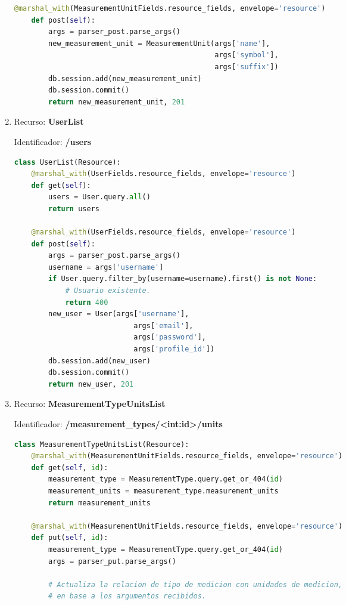 \begin{enumerate}
\begin{lstlisting}[language=Python]
    @marshal_with(MeasurementUnitFields.resource_fields, envelope='resource')
    def post(self):
        args = parser_post.parse_args()
        new_measurement_unit = MeasurementUnit(args['name'],
                                               args['symbol'],
                                               args['suffix'])
        db.session.add(new_measurement_unit)
        db.session.commit()
        return new_measurement_unit, 201
\end{lstlisting}

\item Recurso: \textbf{UserList}

Identificador: \textbf{/users}

\begin{lstlisting}[language=Python]
class UserList(Resource):
    @marshal_with(UserFields.resource_fields, envelope='resource')
    def get(self):
        users = User.query.all()
        return users

    @marshal_with(UserFields.resource_fields, envelope='resource')
    def post(self):
        args = parser_post.parse_args()
        username = args['username']
        if User.query.filter_by(username=username).first() is not None:
            # Usuario existente.
            return 400
        new_user = User(args['username'],
                            args['email'],
                            args['password'],
                            args['profile_id'])
        db.session.add(new_user)
        db.session.commit()
        return new_user, 201
\end{lstlisting}

\item Recurso: \textbf{MeasurementTypeUnitsList}

Identificador: \textbf{/measurement\_types/<int:id>/units}

\begin{lstlisting}[language=Python]
class MeasurementTypeUnitsList(Resource):
    @marshal_with(MeasurementUnitFields.resource_fields, envelope='resource')
    def get(self, id):
        measurement_type = MeasurementType.query.get_or_404(id)
        measurement_units = measurement_type.measurement_units
        return measurement_units

    @marshal_with(MeasurementUnitFields.resource_fields, envelope='resource')
    def put(self, id):
        measurement_type = MeasurementType.query.get_or_404(id)
        args = parser_put.parse_args()

        # Actualiza la relacion de tipo de medicion con unidades de medicion,
        # en base a los argumentos recibidos.


\end{lstlisting}
\end{enumerate}
